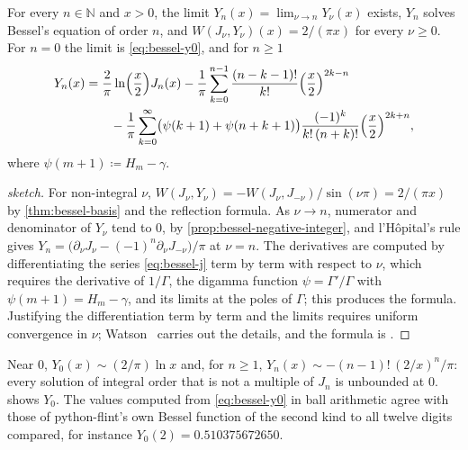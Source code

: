 \begin{theorem}
\label{thm:bessel-y-limit}
For every $n\in\mathbb N$ and $x>0$, the limit $Y_n(x)=\lim_{\nu\to n}Y_\nu(x)$ exists, $Y_n$ solves Bessel's equation of order $n$, and $W(J_\nu,Y_\nu)(x)=2/(\pi x)$ for every $\nu\ge0$. For $n=0$ the limit is \eqref{eq:bessel-y0}, and for $n\ge1$
\begin{align*}
Y_n(x)&=\frac2\pi\ln\Bigl(\frac x2\Bigr)J_n(x)-\frac1\pi\sum_{k=0}^{n-1}\frac{(n-k-1)!}{k!}\Bigl(\frac x2\Bigr)^{2k-n}\\
&\qquad-\frac1\pi\sum_{k=0}^\infty\bigl(\psi(k+1)+\psi(n+k+1)\bigr)\frac{(-1)^k}{k!\,(n+k)!}\Bigl(\frac x2\Bigr)^{2k+n},
\end{align*}
where $\psi(m+1)\coloneqq H_m-\gamma$.
\end{theorem}

\begin{proof}[sketch]
For non-integral $\nu$, $W(J_\nu,Y_\nu)=-W(J_\nu,J_{-\nu})/\sin(\nu\pi)=2/(\pi x)$ by \cref{thm:bessel-basis} and the reflection formula. As $\nu\to n$, numerator and denominator of $Y_\nu$ tend to $0$, by \cref{prop:bessel-negative-integer}, and l'H\^opital's rule gives $Y_n=\bigl(\partial_\nu J_\nu-(-1)^n\partial_\nu J_{-\nu}\bigr)/\pi$ at $\nu=n$. The derivatives are computed by differentiating the series \eqref{eq:bessel-j} term by term with respect to $\nu$, which requires the derivative of $1/\Gamma$, the digamma function $\psi=\Gamma'/\Gamma$ with $\psi(m+1)=H_m-\gamma$, and its limits at the poles of $\Gamma$; this produces the formula. Justifying the differentiation term by term and the limits requires uniform convergence in $\nu$; Watson~\cite[Chap.~III]{watson1944} carries out the details, and the formula is \cite[Eq.~10.8.1]{olver2010nist}.
\end{proof}

Near $0$, $Y_0(x)\sim(2/\pi)\ln x$ and, for $n\ge1$, $Y_n(x)\sim-(n-1)!\,(2/x)^n/\pi$: every solution of integral order that is not a multiple of $J_n$ is unbounded at $0$.  shows $Y_0$. The values computed from \eqref{eq:bessel-y0} in ball arithmetic agree with those of python-flint's own Bessel function of the second kind to all twelve digits compared, for instance $Y_0(2)=0.510375672650$.

